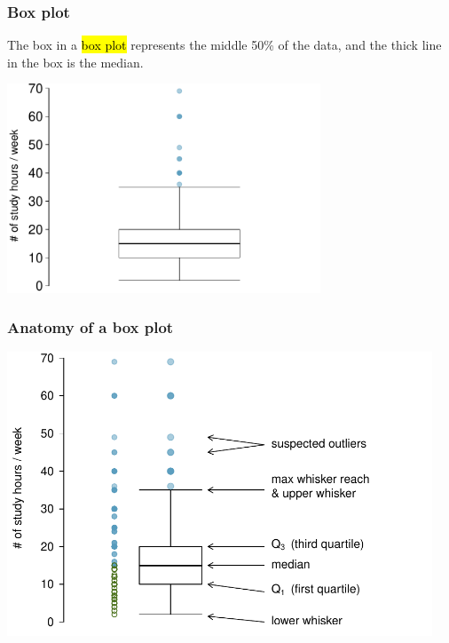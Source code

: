 \begin{frame}
\frametitle{Box plot}

The box in a \hl{box plot} represents the middle 50\% of the data, and the thick line in the box is the median.

\begin{center}
\includegraphics[width=0.7\textwidth]{2-1_numerical_data/figures/study_hours/study_hours_box}
\end{center}

\end{frame}


\begin{frame}
\frametitle{Anatomy of a box plot}

\begin{center}
\includegraphics[width=0.95\textwidth]{2-1_numerical_data/figures/study_hours/study_hours_box_layout}
\end{center}

\end{frame}


